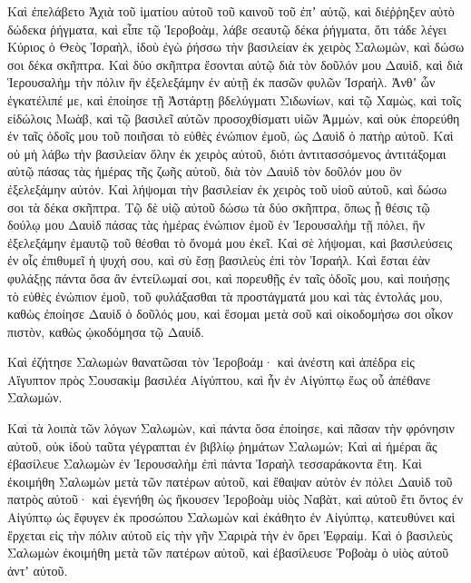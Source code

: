 {Καὶ ἐπελάβετο Ἀχιὰ τοῦ ἱματίου αὐτοῦ τοῦ καινοῦ τοῦ ἐπʼ αὐτῷ, καὶ διέῤῥηξεν αὐτὸ δώδεκα ῥήγματα,
καὶ εἶπε τῷ Ἱεροβοὰμ, λάβε σεαυτῷ δέκα ῥήγματα, ὅτι τάδε λέγει Κύριος ὁ Θεὸς Ἰσραὴλ, ἰδοὺ ἐγὼ ῥήσσω τὴν βασιλείαν ἐκ χειρὸς Σαλωμὼν, καὶ δώσω σοι δέκα σκῆπτρα.
Καὶ δύο σκῆπτρα ἔσονται αὐτῷ διὰ τὸν δοῦλόν μου Δαυὶδ, καὶ διὰ Ἱερουσαλὴμ τὴν πόλιν ἣν ἐξελεξάμην ἐν αὐτῇ ἐκ πασῶν φυλῶν Ἰσραήλ.
Ἀνθʼ ὧν ἐγκατέλιπέ με, καὶ ἐποίησε τῇ Ἀστάρτῃ βδελύγματι Σιδωνίων, καὶ τῷ Χαμὼς, καὶ τοῖς εἰδώλοις Μωὰβ, καὶ τῷ βασιλεῖ αὐτῶν προσοχθίσματι υἱῶν Ἀμμὼν, καὶ οὐκ ἐπορεύθη ἐν ταῖς ὁδοῖς μου τοῦ ποιῆσαι τὸ εὐθὲς ἐνώπιον ἐμοῦ, ὡς Δαυὶδ ὁ πατὴρ αὐτοῦ.
Καὶ οὐ μὴ λάβω τὴν βασιλείαν ὅλην ἐκ χειρὸς αὐτοῦ, διότι ἀντιτασσόμενος ἀντιτάξομαι αὐτῷ πάσας τὰς ἡμέρας τῆς ζωῆς αὐτοῦ, διὰ τὸν Δαυὶδ τὸν δοῦλόν μου ὃν ἐξελεξάμην αὐτόν.
Καὶ λήψομαι τὴν βασιλείαν ἐκ χειρὸς τοῦ υἱοῦ αὐτοῦ, καὶ δώσω σοι τὰ δέκα σκῆπτρα.
Τῷ δὲ υἱῷ αὐτοῦ δώσω τὰ δύο σκῆπτρα, ὅπως ᾖ θέσις τῷ δούλῳ μου Δαυὶδ πάσας τὰς ἡμέρας ἐνώπιον ἐμοῦ ἐν Ἱερουσαλὴμ τῇ πόλει, ἣν ἐξελεξάμην ἐμαυτῷ τοῦ θέσθαι τὸ ὄνομά μου ἐκεῖ.
Καὶ σὲ λήψομαι, καὶ βασιλεύσεις ἐν οἷς ἐπιθυμεῖ ἡ ψυχή σου, καὶ σὺ ἔσῃ βασιλεὺς ἐπὶ τὸν Ἰσραήλ.
Καὶ ἔσται ἐὰν φυλάξῃς πάντα ὅσα ἂν ἐντείλωμαί σοι, καὶ πορευθῇς ἐν ταῖς ὁδοῖς μου, καὶ ποιήσῃς τὸ εὐθὲς ἐνώπιον ἐμοῦ, τοῦ φυλάξασθαι τὰ προστάγματά μου καὶ τὰς ἐντολάς μου, καθὼς ἐποίησε Δαυὶδ ὁ δοῦλός μου, καὶ ἔσομαι μετὰ σοῦ καὶ οἰκοδομήσω σοι οἶκον πιστὸν, καθὼς ᾠκοδόμησα τῷ Δαυίδ.
\par }{\PP {}Καὶ ἐζήτησε Σαλωμὼν θανατῶσαι τὸν Ἱεροβοάμ· καὶ ἀνέστη καὶ ἀπέδρα εἰς Αἴγυπτον πρὸς Σουσακὶμ βασιλέα Αἰγύπτου, καὶ ἦν ἐν Αἰγύπτῳ ἕως οὗ ἀπέθανε Σαλωμών.
\par }{\PP {}Καὶ τὰ λοιπὰ τῶν λόγων Σαλωμὼν, καὶ πάντα ὅσα ἐποίησε, καὶ πᾶσαν τὴν φρόνησιν αὐτοῦ, οὐκ ἰδοὺ ταῦτα γέγραπται ἐν βιβλίῳ ῥημάτων Σαλωμών;
Καὶ αἱ ἡμέραι ἃς ἐβασίλευε Σαλωμὼν ἐν Ἱερουσαλὴμ ἐπὶ πάντα Ἰσραὴλ τεσσαράκοντα ἔτη.
Καὶ ἐκοιμήθη Σαλωμὼν μετὰ τῶν πατέρων αὐτοῦ, καὶ ἔθαψαν αὐτὸν ἐν πόλει Δαυὶδ τοῦ πατρὸς αὐτοῦ· καὶ ἐγενήθη ὡς ἤκουσεν Ἱεροβοὰμ υἱὸς Ναβὰτ, καὶ αὐτοῦ ἔτι ὄντος ἐν Αἰγύπτῳ ὡς ἔφυγεν ἐκ προσώπου Σαλωμὼν καὶ ἐκάθητο ἐν Αἰγύπτῳ, κατευθύνει καὶ ἔρχεται εἰς τὴν πόλιν αὐτοῦ εἰς τὴν γῆν Σαριρὰ τὴν ἐν ὄρει Ἐφραίμ. Καὶ ὁ βασιλεὺς Σαλωμὼν ἐκοιμήθη μετὰ τῶν πατέρων αὐτοῦ, καὶ ἐβασίλευσε Ῥοβοὰμ ὁ υἱὸς αὐτοῦ ἀντʼ αὐτοῦ.

}
